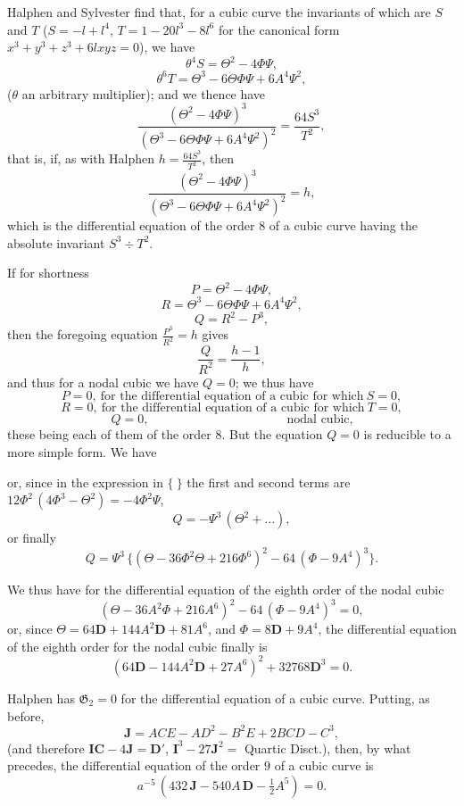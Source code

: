 \documentclass[11pt]{article}
\begin{document}
Halphen and Sylvester find that, for a cubic curve the invariants of which are $S$ and $T$ ($S = -l + l^4$, $T = 1 - 20 l^3 - 8 l^6$ for the canonical form $x^3 + y^3 + z^3 + 6 l x y z = 0$), we have
\[
\theta^4 S = \Theta^2 - 4\Phi\Psi,
\]
\[
\theta^6 T = \Theta^3 - 6\Theta\Phi\Psi + 6 A^4\Psi^2,
\]
($\theta$ an arbitrary multiplier); and we thence have
\[
\frac{(\Theta^2 - 4\Phi\Psi)^3}{(\Theta^3 - 6\Theta\Phi\Psi + 6 A^4\Psi^2)^2} = \frac{64 S^3}{T^2},
\]
that is, if, as with Halphen $h = \tfrac{64 S^3}{T^2}$, then
\[
\frac{(\Theta^2 - 4\Phi\Psi)^3}{(\Theta^3 - 6\Theta\Phi\Psi + 6 A^4\Psi^2)^2} = h,
\]
which is the differential equation of the order $8$ of a cubic curve having the absolute invariant $S^3 \div T^2$.

If for shortness
\[
P = \Theta^2 - 4\Phi\Psi,
\]
\[
R = \Theta^3 - 6\Theta\Phi\Psi + 6 A^4\Psi^2,
\]
\[
Q = R^2 - P^3,
\]
then the foregoing equation $\tfrac{P^3}{R^2} = h$ gives
\[
\frac{Q}{R^2} = \frac{h - 1}{h},
\]
and thus for a nodal cubic we have $Q = 0$; we thus have
\[
P = 0,\ \text{for the differential equation of a cubic for which}\ S = 0,
\]
\[
R = 0,\ \text{for the differential equation of a cubic for which}\ T = 0,
\]
\[
Q = 0,\quad\quad\quad\quad\quad\quad\quad\quad\quad\quad\quad \text{nodal cubic,}
\]
these being each of them of the order $8$. But the equation $Q = 0$ is reducible to a more simple form. We have

or, since in the expression in $\{\ \}$ the first and second terms are $12\Phi^2\,(4\Phi^3 - \Theta^2) = -4\Phi^2\Psi$,
\[
Q = -\Psi^3\,(\Theta^2 + \ldots),
\]
or finally
\[
Q = \Psi^3\,\{(\Theta - 36\Phi^2\Theta + 216\Phi^6)^2 - 64\,(\Phi - 9 A^4)^3\}.
\]

We thus have for the differential equation of the eighth order of the nodal cubic
\[
(\Theta - 36 A^2\Phi + 216 A^6)^2 - 64\,(\Phi - 9 A^4)^3 = 0,
\]
or, since $\Theta = 64\mathbf{D} + 144 A^2\mathbf{D} + 81 A^6$, and $\Phi = 8\mathbf{D} + 9 A^4$, the differential equation of the eighth order for the nodal cubic finally is
\[
(64\mathbf{D} - 144 A^2\mathbf{D} + 27 A^6)^2 + 32768\mathbf{D}^3 = 0.
\]

Halphen has $\mathfrak{G}_2 = 0$ for the differential equation of a cubic curve. Putting, as before,
\[
\mathbf{J} = A C E - A D^2 - B^2 E + 2 B C D - C^3,
\]
(and therefore $\mathbf{IC} - 4\mathbf{J} = \mathbf{D}'$, $\mathbf{I}^3 - 27\mathbf{J}^2 = $ Quartic Disct.), then, by what precedes, the differential equation of the order $9$ of a cubic curve is
\[
a^{-5}\,(432\,\mathbf{J} - 540 A\,\mathbf{D} - \tfrac{1}{2} A^5) = 0.
\]
\end{document}
